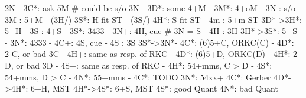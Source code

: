 2N - 
3C*: ask 5M  # could be s/o 3N
   - 3D*: some 4+M
        - 3M*: 4+oM
        - 3N : s/o
   - 3M : 5+M
        - (3H/) 3S*: H fit ST
        - (3S/) 4H*: S fit ST
        - 4m : 5+m ST
3D*->3H*: 5+H 
        - 3S : 4+S
   - 3S*: 3433
   - 3N+: 4H, cue  # 3N = S
   - 4H : 3H
3H*->3S*: 5+S
   - 3N*: 4333
   - 4C+: 4S, cue
   - 4S : 3S
3S*->3N*- 4C*: (6)5+C, ORKC(C)
             - 4D*: 2-C, or bad 3C
             - 4H+: same as resp. of RKC
        - 4D*: (6)5+D, ORKC(D)
             - 4H*: 2-D, or bad 3D
             - 4S+: same as resp. of RKC
        - 4H*: 54+mms, C > D
        - 4S*: 54+mms, D > C
        - 4N*: 55+mms
   - 4C*: TODO
3N*: 54xx+
4C*: Gerber
4D*->4H*: 6+H, MST
4H*->4S*: 6+S, MST
4S*: good Quant
4N*: bad Quant